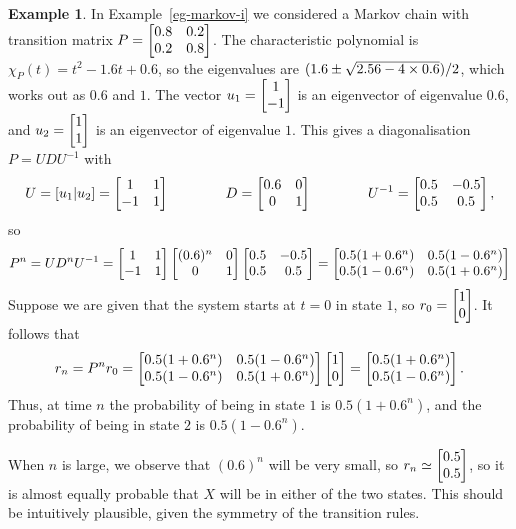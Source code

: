 \documentclass[reqno]{amsart}
\theoremstyle{definition}
\newtheorem{example}[theorem]{Example}
\begin{document}
\begin{example}\label{eg-markov-i-again}
 In Example~\ref{eg-markov-i} we considered a Markov chain with
 transition matrix $P=\left[\begin{matrix} 0.8 & 0.2\\ 0.2 & 0.8 \end{matrix}\right]$.  The
 characteristic polynomial is $\chi_P(t)=t^2-1.6t+0.6$, so the
 eigenvalues are $(1.6\pm\sqrt{2.56-4\times 0.6})/2$, which works out as
 $0.6$ and $1$.  The vector $u_1=\left[\begin{matrix} 1\\ -1\end{matrix}\right]$ is an eigenvector of
 eigenvalue $0.6$, and $u_2=\left[\begin{matrix} 1\\ 1\end{matrix}\right]$ is an eigenvector of
 eigenvalue $1$.  This gives a diagonalisation $P=UDU^{-1}$ with 
 \[ U = [u_1|u_2] = \left[\begin{matrix} 1&1\\-1&1 \end{matrix}\right] \hspace{4em}
    D = \left[\begin{matrix} 0.6 & 0 \\ 0 & 1 \end{matrix}\right] \hspace{4em}
    U^{-1} = \left[\begin{matrix} 0.5&-0.5 \\ 0.5&0.5 \end{matrix}\right], 
 \]
 so 
 \[ P^n = UD^nU^{-1} = 
     \left[\begin{matrix} 1&1\\-1&1 \end{matrix}\right] 
     \left[\begin{matrix} (0.6)^n & 0 \\ 0 & 1 \end{matrix}\right] 
     \left[\begin{matrix} 0.5&-0.5 \\ 0.5&0.5 \end{matrix}\right] = 
     \left[\begin{matrix} 0.5(1+0.6^n) &  0.5(1-0.6^n) \\  
          0.5(1-0.6^n) &  0.5(1+0.6^n) \end{matrix}\right]  
 \]
 Suppose we are given that the system starts at $t=0$ in state $1$, so
 $r_0=\left[\begin{matrix} 1\\ 0\end{matrix}\right]$.  It follows that
 \[ r_n =
    P^n r_0 =
    \left[\begin{matrix} 0.5(1+0.6^n) &  0.5(1-0.6^n) \\  
         0.5(1-0.6^n) &  0.5(1+0.6^n) \end{matrix}\right]
    \left[\begin{matrix} 1 \\ 0 \end{matrix}\right] =
    \left[\begin{matrix} 0.5(1+0.6^n) \\
         0.5(1-0.6^n) \end{matrix}\right].
 \]
 Thus, at time $n$ the probability of being in state $1$ is
 $0.5(1+0.6^n)$, and the probability of being in state $2$ is
 $0.5(1-0.6^n)$. 

 When $n$ is large, we observe that $(0.6)^n$ will be very small, so
 $r_n\simeq\left[\begin{matrix} 0.5\\0.5\end{matrix}\right]$, so it is almost equally probable that
 $X$ will be in either of the two states.  This should be intuitively
 plausible, given the symmetry of the transition rules.
\end{example}
\end{document}
